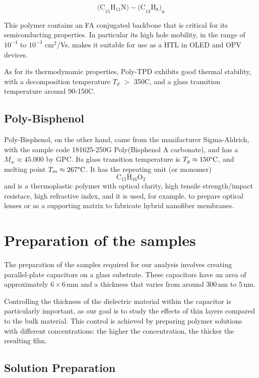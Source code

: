 \[
\text{(C}_{15}\text{H}_{11}\text{N)}-\text{(C}_{13}\text{H}_{8}\text{)}_{\text{n}}
\]

This polymer contains an FA conjugated backbone that is critical for its semiconducting properties. In particular its high hole mobility, in the range of $10^{-4}$ to $10^{-3}$ cm$^2$/Vs, makes it suitable for use as a \ac{HTL} in \ac{OLED} and \ac{OPV} devices.

As for its thermodynamic properties, Poly-TPD exhibits good thermal stability, with a decomposition temperature $T_d$ $>$ 350\degree C, and a glass transition temperature around 90-150\degree C. %

\subsection{Poly-Bisphenol}
Poly-Bisphenol, on the other hand, came from the manifacturer Sigma-Aldrich, with the sample code 181625-250G Poly(Bisphenol A carbonate), and has a $M_w \approx 45.000$ by \ac{GPC}. Its glass transition temperature is $T_g \approx 150 \degree \text{C}$, and melting point $T_m \approx 267 \degree \text{C}$. %
It has the repeating unit (or monomer)
\[
\text{C}_{15}\text{H}_{16}\text{O}_{2}
\]
and is a thermoplastic polymer with optical clarity, high tensile strength/impact resistace, high refractive index, and it is used, for example, to prepare optical lenses or as a supporting matrix to fabricate hybrid nanofiber membranes.

%
\section{Preparation of the samples}

The preparation of the samples required for our analysis involves creating parallel-plate capacitors on a glass substrate. These capacitors have an area of approximately \( 6 \times 6 \, \text{mm} \) and a thickness that varies from around \( 300 \, \text{nm} \) to \( 5 \, \text{nm} \).

Controlling the thickness of the dielectric material %
within the capacitor is particularly important, as our goal is to study the effects of thin layers compared to the bulk material. This control is achieved by preparing polymer solutions with different concentrations: the higher the concentration, the thicker the resulting film.
\subsection{Solution Preparation}

